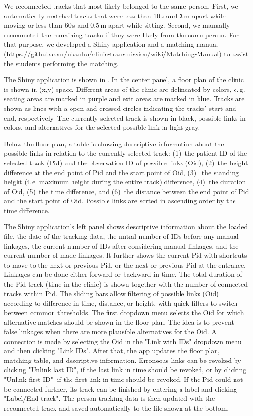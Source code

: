 \documentclass[fleqn,11pt]{wlscirep_supp}
\newcommand\ie{i.\,e.\xspace}
\newcommand\eg{e.\,g.\xspace}
\begin{document}
We reconnected tracks that most likely belonged to the same person. First, we automatically matched tracks that were less than 10\,s and 3\,m apart while moving or less than 60\,s and 0.5\,m apart while sitting. Second, we manually reconnected the remaining tracks if they were likely from the same person. For that purpose, we developed a Shiny application and a matching manual (\url{https://github.com/nbanho/clinic-transmission/wiki/Matching-Manual}) to assist the students performing the matching. 

The Shiny application is shown in . In the center panel, a floor plan of the clinic is shown in (x,y)-space. Different areas of the clinic are delineated by colors, \eg seating areas are marked in purple and exit areas are marked in blue. Tracks are shown as lines with a open and crossed circles indicating the tracks' start and end, respectively. The currently selected track is shown in black, possible links in colors, and alternatives for the selected possible link in light gray. 

Below the floor plan, a table is showing descriptive information about the possible links in relation to the currently selected track: (1)~the patient ID of the selected track (Pid) and the observation ID of possible links (Oid), (2)~the height difference at the end point of Pid and the start point of Oid, (3)~ the standing height (\ie maximum height during the entire track) difference, (4)~the duration of Oid, (5)~the time difference, and (6)~the distance between the end point of Pid and the start point of Oid. Possible links are sorted in ascending order by the time difference. 

The Shiny application's left panel shows descriptive information about the loaded file, the date of the tracking data, the initial number of IDs before any manual linkages, the current number of IDs after considering manual linkages, and the current number of made linkages. It further shows the current Pid with shortcuts to move to the next or previous Pid, or the next or previous Pid at the entrance. Linkages can be done either forward or backward in time. The total duration of the Pid track (time in the clinic) is shown together with the number of connected tracks within Pid. The sliding bars allow filtering of possible links (Oid) according to difference in time, distance, or height, with quick filters to switch between common thresholds. The first dropdown menu selects the Oid for which alternative matches should be shown in the floor plan. The idea is to prevent false linkages when there are more plausible alternatives for the Oid. A connection is made by selecting the Oid in the "Link with IDs" dropdown menu and then clicking "Link IDs". After that, the app updates the floor plan, matching table, and descriptive information. Erroneous links can be revoked by clicking "Unlink last ID", if the last link in time should be revoked, or by clicking "Unlink first ID", if the first link in time should be revoked. If the Pid could not be connected further, its track can be finished by entering a label and clicking "Label/End track". The person-tracking data is then updated with the reconnected track and saved automatically to the file shown at the bottom.
\end{document}

